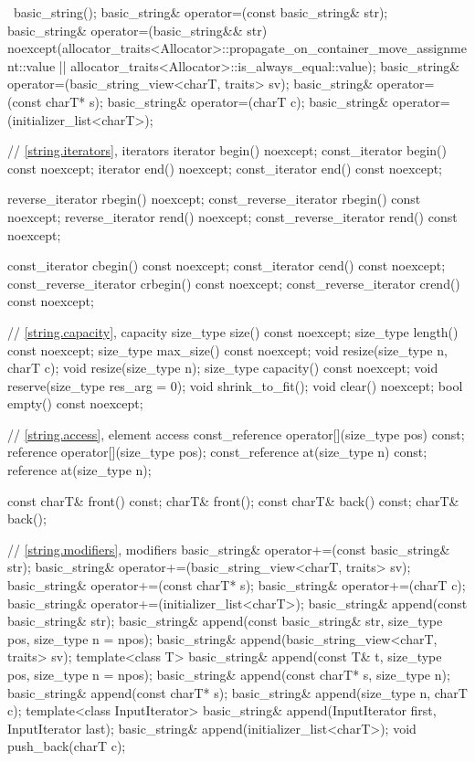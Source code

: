 \begin{codeblock}
{{   ~basic_string();
    basic_string& operator=(const basic_string& str);
    basic_string& operator=(basic_string&& str)
      noexcept(allocator_traits<Allocator>::propagate_on_container_move_assignment::value ||
               allocator_traits<Allocator>::is_always_equal::value);
    basic_string& operator=(basic_string_view<charT, traits> sv);
    basic_string& operator=(const charT* s);
    basic_string& operator=(charT c);
    basic_string& operator=(initializer_list<charT>);

    // \ref{string.iterators}, iterators
    iterator       begin() noexcept;
    const_iterator begin() const noexcept;
    iterator       end() noexcept;
    const_iterator end() const noexcept;

    reverse_iterator       rbegin() noexcept;
    const_reverse_iterator rbegin() const noexcept;
    reverse_iterator       rend() noexcept;
    const_reverse_iterator rend() const noexcept;

    const_iterator         cbegin() const noexcept;
    const_iterator         cend() const noexcept;
    const_reverse_iterator crbegin() const noexcept;
    const_reverse_iterator crend() const noexcept;

    // \ref{string.capacity}, capacity
    size_type size() const noexcept;
    size_type length() const noexcept;
    size_type max_size() const noexcept;
    void resize(size_type n, charT c);
    void resize(size_type n);
    size_type capacity() const noexcept;
    void reserve(size_type res_arg = 0);
    void shrink_to_fit();
    void clear() noexcept;
    bool empty() const noexcept;

    // \ref{string.access}, element access
    const_reference operator[](size_type pos) const;
    reference       operator[](size_type pos);
    const_reference at(size_type n) const;
    reference       at(size_type n);

    const charT& front() const;
    charT&       front();
    const charT& back() const;
    charT&       back();

    // \ref{string.modifiers}, modifiers
    basic_string& operator+=(const basic_string& str);
    basic_string& operator+=(basic_string_view<charT, traits> sv);
    basic_string& operator+=(const charT* s);
    basic_string& operator+=(charT c);
    basic_string& operator+=(initializer_list<charT>);
    basic_string& append(const basic_string& str);
    basic_string& append(const basic_string& str, size_type pos,
                         size_type n = npos);
    basic_string& append(basic_string_view<charT, traits> sv);
    template<class T>
      basic_string& append(const T& t, size_type pos, size_type n = npos);
    basic_string& append(const charT* s, size_type n);
    basic_string& append(const charT* s);
    basic_string& append(size_type n, charT c);
    template<class InputIterator>
      basic_string& append(InputIterator first, InputIterator last);
    basic_string& append(initializer_list<charT>);
    void push_back(charT c);

}}
\end{codeblock}
